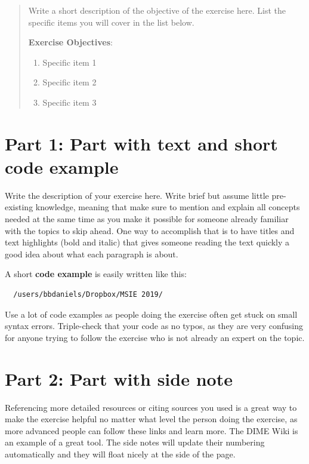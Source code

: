 \documentclass{tufte-handout}
\begin{document}
\begin{abstract}
Write a short description of the objective of the exercise here. List the specific items you will cover in the list below.

\bigskip\noindent \textbf{Exercise Objectives}:
\begin{enumerate}
  \item Specific item 1
  \item Specific item 2
  \item Specific item 3
\end{enumerate}
\end{abstract}

\section{Part 1: Part with text and short code example}

Write the description of your exercise here. Write brief but assume little pre-existing knowledge, meaning that make sure to mention and explain all concepts needed at the same time as you make it possible for someone already familiar with the topics to skip ahead. One way to accomplish that is to have titles and text highlights (bold and italic) that gives someone reading the text quickly a good idea about what each paragraph is about.

A short \textbf{code example} is easily written like this:

\begin{Verbatim}
  /users/bbdaniels/Dropbox/MSIE 2019/
\end{Verbatim}


Use a lot of code examples as people doing the exercise often get stuck on small syntax errors. Triple-check that your code as no typos, as they are very confusing for anyone trying to follow the exercise who is not already an expert on the topic.

\section{Part 2: Part with side note}
Referencing more detailed resources or citing sources you used is a great way to make the exercise helpful no matter what level the person doing the exercise, as more advanced people can follow these links and learn more. The DIME Wiki is an example of a great tool. The side notes will update their numbering automatically and they will float nicely at the side of the page.
\end{document}
